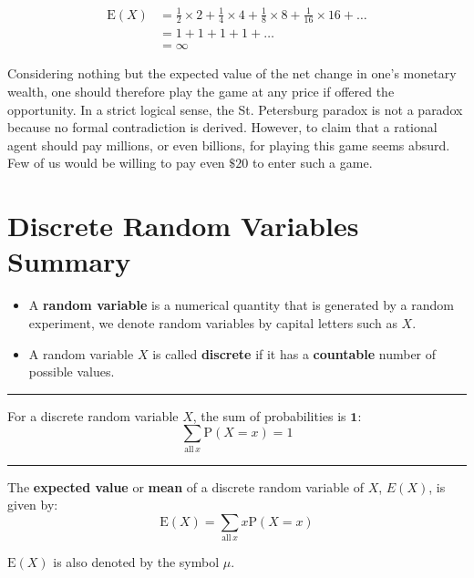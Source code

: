 \documentclass[11pt,a4paper]{book}
\begin{document}
\begin{align*}
\text{E}\left(X\right) & =\frac{1}{2}\times2+\frac{1}{4}\times4+\frac{1}{8}\times8+\frac{1}{16}\times16+\ldots\\
 & =1+1+1+1+\ldots\\
 & =\infty
\end{align*}

Considering nothing but the expected value of the net change in one's
monetary wealth, one should therefore play the game at any price if
offered the opportunity. In a strict logical sense, the St. Petersburg
paradox is not a paradox because no formal contradiction is derived.
However, to claim that a rational agent should pay millions, or even
billions, for playing this game seems absurd. Few of us would be willing
to pay even $\$20$ to enter such a game.

\newpage

\section*{Discrete Random Variables Summary}

\bigskip

\begin{itemize}

\item A \textbf{random variable} is a numerical quantity that is generated
by a random experiment, we denote random variables by capital letters
such as $X$.

\item A random variable $X$ is called \textbf{discrete} if it has a \textbf{countable} number of possible values.


\end{itemize}

\vspace{5pt}
\hrule
\vspace{6pt}


For a discrete random variable $X$, the sum of probabilities is $\textbf{1}$:
\[
\sum_{\text{all}\,x}\text{P}\left(X=x\right)=1
\]

\vspace{5pt}
\hrule
\vspace{6pt}


The \textbf{expected value} or \textbf{mean} of a discrete random
variable of $X$, $E\left(X\right)$, is given by:
\[
\text{E}\left(X\right)=\sum_{\text{all}\,x}x\text{P}\left(X=x\right)
\]

$\text{E}\left(X\right)$ is also denoted by the symbol $\mu$.
\end{document}
